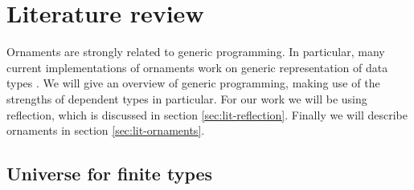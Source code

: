 \section{Literature review}\label{sec:lit}

Ornaments are strongly related to generic programming.
In particular, many current implementations of ornaments work on
generic representation of data types \cite{dagand12,dagand14-essence,dagand14-transporting}.
We will give an overview of generic programming, making use of the
strengths of dependent types in particular.
For our work we will be using reflection, which is discussed in
section \ref{sec:lit-reflection}.
Finally we will describe ornaments in section
\ref{sec:lit-ornaments}.



\subsection{Universe for finite types}

